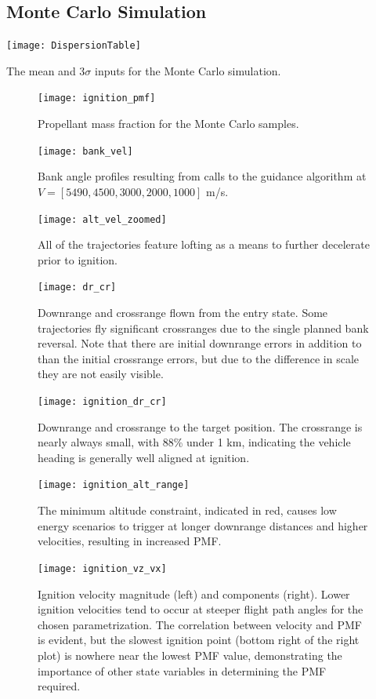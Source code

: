 \documentclass[letterpaper, paper,11pt]{AAS}
\begin{document}
\subsection{Monte Carlo Simulation}
\begin{table}[h!]
	\centering
	\texttt{[image: DispersionTable]} 
	\caption{The mean and 3$\sigma$ inputs for the Monte Carlo simulation.}
	\label{table_input_dispersions}
\end{table}
\begin{figure}[h!]
	\centering
	\texttt{[image: ignition\_pmf]} 
	\caption{Propellant mass fraction for the Monte Carlo samples.}
	\label{fig_mc_pmf}
\end{figure}
\begin{figure}[h!]
	\centering
	\texttt{[image: bank\_vel]} 
	\caption{Bank angle profiles resulting from calls to the guidance algorithm at $ V=[5490, 4500, 3000, 2000, 1000] $ m/s.}
	\label{fig_mc_bank}
\end{figure}
\begin{figure}[h!]
	\centering
	\texttt{[image: alt\_vel\_zoomed]} 
	\caption{All of the trajectories feature lofting as a means to further decelerate prior to ignition.}
	\label{fig_mc_alt_vel}
\end{figure}
\begin{figure}[h!]
	\centering
	\texttt{[image: dr\_cr]} 
	\caption{Downrange and crossrange flown from the entry state. Some trajectories fly significant crossranges due to the single planned bank reversal. Note that there are initial downrange errors in addition to than the initial crossrange errors, but due to the difference in scale they are not easily visible.}
	\label{fig_mc_entry_dr_cr}
\end{figure}
\begin{figure}[h!]
	\centering
	\texttt{[image: ignition\_dr\_cr]} 
	\caption{Downrange and crossrange to the target position. The crossrange is nearly always small, with 88\% under 1 km, indicating the vehicle heading is generally well aligned at ignition.}
	\label{fig_mc_ignition_dr_cr}
\end{figure}
\begin{figure}[h!]
	\centering
	\texttt{[image: ignition\_alt\_range]} 
	\caption{The minimum altitude constraint, indicated in red, causes low energy scenarios to trigger at longer downrange distances and higher velocities, resulting in increased PMF.}
	\label{fig_mc_ignition_alt_vs_distance}
\end{figure}
\begin{figure}[h!]
	\centering
	\texttt{[image: ignition\_vz\_vx]} 
	\caption{Ignition velocity magnitude (left) and components (right). Lower ignition velocities tend to occur at steeper flight path angles for the chosen parametrization. The correlation between velocity and PMF is evident, but the slowest ignition point (bottom right of the right plot) is nowhere near the lowest PMF value, demonstrating the importance of other state variables in determining the PMF required.}
	\label{fig_mc_ignition_vel}
\end{figure}
\end{document}
